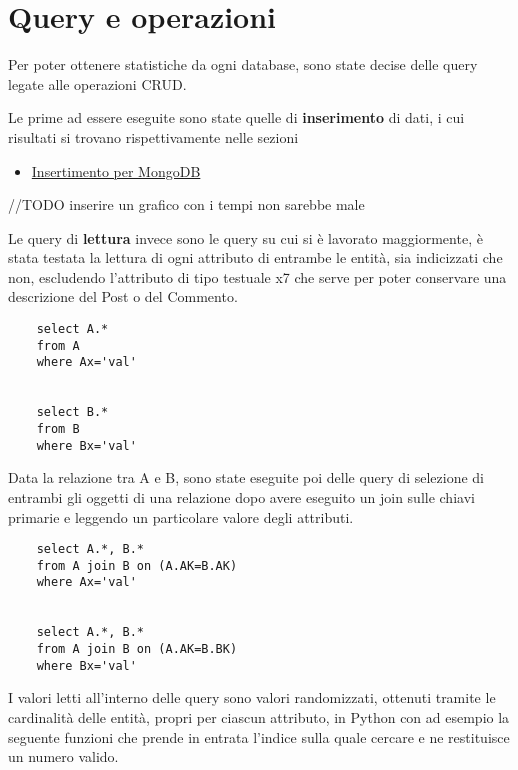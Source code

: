 \section{Query e operazioni}

Per poter ottenere statistiche da ogni database, sono state decise delle query legate alle operazioni CRUD.

Le prime ad essere eseguite sono state quelle di \textbf{inserimento} di dati, i cui risultati si trovano rispettivamente nelle sezioni
\begin{itemize}
    \item \hyperref[sec:InsertMongo]{Insertimento per MongoDB}
\end{itemize} 

//TODO inserire un grafico con i tempi non sarebbe male

Le query di \textbf{lettura} invece sono le query su cui si è lavorato maggiormente, è stata testata la lettura di ogni attributo di entrambe le 
entità, sia indicizzati che non, escludendo l'attributo di tipo testuale x7 che serve per poter conservare una descrizione del Post o del Commento.

\begin{verbatim}
    select A.*
    from A
    where Ax='val'
    
    
    select B.*
    from B
    where Bx='val' 
\end{verbatim}

Data la relazione tra A e B, sono state eseguite poi delle query di selezione di entrambi gli oggetti di una relazione dopo avere eseguito un join 
sulle chiavi primarie e leggendo un particolare valore degli attributi.

\begin{verbatim}
    select A.*, B.*
    from A join B on (A.AK=B.AK)
    where Ax='val'


    select A.*, B.*
    from A join B on (A.AK=B.BK)
    where Bx='val'
\end{verbatim}

I valori letti all'interno delle query sono valori randomizzati, ottenuti tramite le cardinalità delle entità, propri per ciascun attributo, in Python con 
ad esempio la seguente funzioni che prende in entrata l'indice sulla quale cercare e ne restituisce un numero valido.

